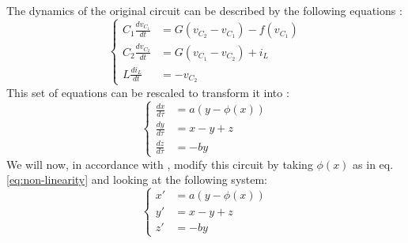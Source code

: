 The dynamics of the original circuit can be described by the following
equations \cite[eq. (1.1)]{Matsumoto85}:
\begin{equation}
  \label{eq:dynamics}
  \left\{
    \begin{aligned}
      C_1\frac{dv_{C_1}}{dt} &= G(v_{C_2}-v_{C_1})-f(v_{C_1})\\
      C_2\frac{dv_{C_2}}{dt} &= G(v_{C_1}-v_{C_2}) + i_L\\
      L \frac{di_L}{dt} &= -v_{C_2}
    \end{aligned}
  \right.
\end{equation}
This set of equations can be rescaled to transform it into \cite[eq. (1.1)]{Chua86}:
\begin{equation}
  \label{eq:rescaling}
  \left\{
    \begin{aligned}
      \frac{dx}{d\tau} &= a(y-\phi(x))\\
      \frac{dy}{d\tau} &= x - y + z\\
      \frac{dz}{d\tau} &= -b y
    \end{aligned}
  \right.
\end{equation}
We will now, in accordance with \cite{hirsch12}, modify this circuit
by taking $\phi(x)$ as in eq. \ref{eq:non-linearity} and looking at the
following system:
\begin{equation}
  \label{eq:system}
  \left\{
    \begin{aligned}
      x' &= a(y-\phi(x))\\
      y' &= x-y+z\\
      z' &= -by
    \end{aligned}
  \right.
\end{equation}



